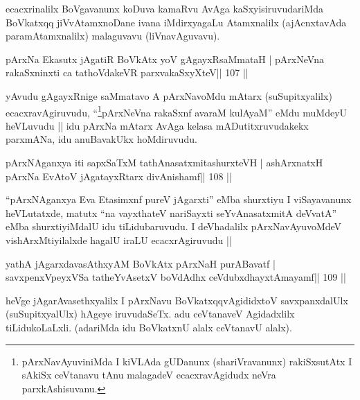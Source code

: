 \begin{artha}
ecacxrinalilx BoVgavanunx koDuva kamaRvu AvAga kaSxyisiruvudariMda  BoVkatxqq jiVvAtamxnoDane ivana iMdirxyagaLu Atamxnalilx (ajAcnxtavAda paramAtamxnalilx) malaguvavu (liVnavAguvavu).
\end{artha}

\begin{shl}
pArxNa Ekasutx jAgatiR BoVkAtx yoV gAgayxRsaMmataH |
pArxNeVna rakaSxninxti ca tathoVdakeVR parxvakaSxyXteV\hfill || 107 ||
\end{shl}

\begin{artha}
yAvudu gAgayxRnige saMmatavo A pArxNavoMdu mAtarx (suSupitxyalilx)  ecacxravAgiruvudu, ``\footnote[12]{pArxNavAyuviniMda I kiVLAda gUDanunx  (shariVravanunx) rakiSxsutAtx I sAkiSx ceVtanavu tAnu malagadeV ecacxravAgidudx neVra parxkAshisuvanu.}pArxNeVna rakaSxnf avaraM kulAyaM'' eMdu muMdeyU heVLuvudu || idu pArxNa mAtarx AvAga kelasa mADutitxruvudakekx parxmANa, idu anuBavakUkx hoMdiruvudu.
\end{artha}


\begin{shl}
pArxNAganxya iti sapxSaTxM tathA\s nasatxmitashurxteVH |
ashArxnatxH pArxNa EvAtoV jAgatayxRtarx divAnishamf\hfill || 108 ||
\end{shl}

\begin{artha}
``pArxNAganxya Eva Etasimxnf pureV jAgarxti'' eMba shurxtiyu I 
viSayavanunx heVLutatxde, matutx ``na vayxthateV nariSayxti seYvAnasatxmitA deVvatA'' eMba shurxtiyiMdalU idu tiLidubaruvudu. I deVhadalilx pArxNavAyuvoMdeV vishArxMtiyilalxde hagalU iraLU ecacxrAgiruvudu ||
\end{artha} 

\begin{shl}
yathA jAgarxdavasAthxyAM BoVkAtx pArxNaH purA\s Bavatf |
savxpenxV\s peyxVSa tatheYvA\s\s setxV boVdAdhx ceVdubxdhayxtAmayamf\hfill || 109 ||
\end{shl}

\begin{artha}
heVge jAgarAvasethxyalilx I pArxNavu BoVkatxqqvAgididxtoV  savxpanxdalUlx (suSupitx\-yalUlx) hAgeye iruvudaSeTx. adu ceVtanaveV  Agidadxlilx tiLidukoLaLxli. (adariMda idu BoVkatxnU alalx ceVtanavU alalx).
\end{artha}


